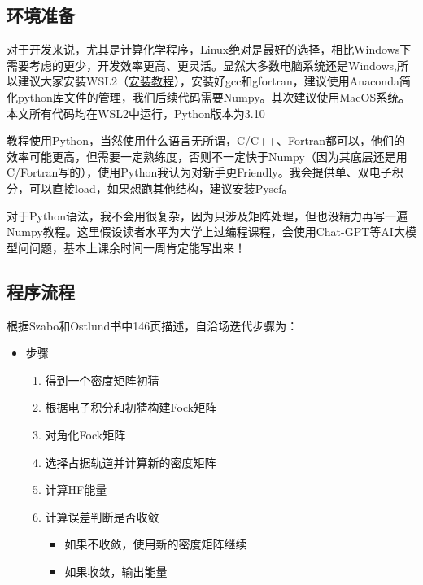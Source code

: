 \documentclass[12pt, a4paper, oneside]{ctexart}
\begin{document}
\subsection{环境准备}
  对于开发来说，尤其是计算化学程序，Linux绝对是最好的选择，相比Windows下需要考虑的更少，开发效率更高、更灵活。显然大多数电脑系统还是Windows,所以建议大家安装WSL2（\href{https://mp.weixin.qq.com/s/DoK08_Qpvt28ZjAZQa8MZA}{安装教程}），安装好gcc和gfortran，建议使用Anaconda简化python库文件的管理，我们后续代码需要Numpy。其次建议使用MacOS系统。本文所有代码均在WSL2中运行，Python版本为3.10\par
  教程使用Python，当然使用什么语言无所谓，C/C++、Fortran都可以，他们的效率可能更高，但需要一定熟练度，否则不一定快于Numpy（因为其底层还是用C/Fortran写的），使用Python我认为对新手更Friendly。我会提供单、双电子积分，可以直接load，如果想跑其他结构，建议安装Pyscf。\par
对于Python语法，我不会用很复杂，因为只涉及矩阵处理，但也没精力再写一遍Numpy教程。这里假设读者水平为大学上过编程课程，会使用Chat-GPT等AI大模型问问题，基本上课余时间一周肯定能写出来！
\subsection{程序流程}
根据Szabo和Ostlund书中146页描述，自洽场迭代步骤为：
\begin{itemize}
  \item 步骤
  \begin{enumerate}
	\item 得到一个密度矩阵初猜
	\item 根据电子积分和初猜构建Fock矩阵
	\item 对角化Fock矩阵
	\item 选择占据轨道并计算新的密度矩阵
	\item 计算HF能量
	\item 计算误差判断是否收敛
	\begin{itemize}
	  \item 如果不收敛，使用新的密度矩阵继续
	  \item 如果收敛，输出能量
	\end{itemize}
  \end{enumerate}
\end{itemize}
\end{document}
